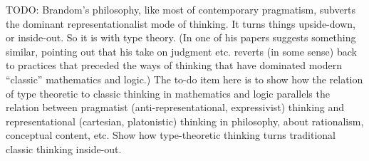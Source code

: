 \begin{ednote}
  TODO: Brandom's philosophy, like most of contemporary pragmatism,
  subverts the dominant representationalist mode of thinking.  It
  turns things upside-down, or inside-out.  So it is with type theory.
  (In one of his papers \ML{} suggests something similar, pointing out
  that his take on judgment etc. reverts (in some sense) back to
  practices that preceded the ways of thinking that have dominated
  modern ``classic'' mathematics and logic.)  The to-do item here is
  to show how the relation of type theoretic to classic thinking in
  mathematics and logic parallels the relation between pragmatist
  (anti-representational, expressivist) thinking and representational
  (cartesian, platonistic) thinking in philosophy, about rationalism,
  conceptual content, etc.  Show how type-theoretic thinking turns
  traditional classic thinking inside-out.
\end{ednote}

